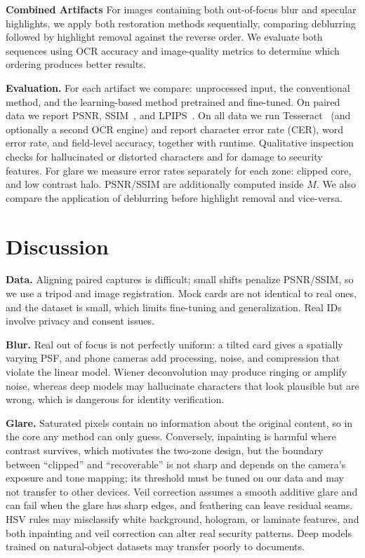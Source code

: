 \documentclass{article}
\begin{document}
\textbf{Combined Artifacts}
For images containing both out-of-focus blur and specular highlights, we apply both restoration methods sequentially, comparing deblurring followed by highlight removal against the reverse order. We evaluate both sequences using OCR accuracy and image-quality metrics to determine which ordering produces better results.

\textbf{Evaluation.} For each artifact we compare: unprocessed input, the conventional method, and the learning-based method pretrained and fine-tuned. On paired data we report PSNR, SSIM~\cite{wang2004}, and LPIPS~\cite{zhang2018}. On all data we run Tesseract~\cite{smith2007} (and optionally a second OCR engine) and report character error rate (CER), word error rate, and field-level accuracy, together with runtime. Qualitative inspection checks for hallucinated or distorted characters and for damage to security features. For glare we measure error rates separately for each zone: clipped core, and low contrast halo. PSNR/SSIM are additionally computed inside $M$. We also compare the application of deblurring before highlight removal and vice-versa.

\section{Discussion}
\label{sec:majhead}
\textbf{Data.} Aligning paired captures is difficult; small shifts penalize PSNR/SSIM, so we use a tripod and image registration. Mock cards are not identical to real ones, and the dataset is small, which limits fine-tuning and generalization. Real IDs involve privacy and consent issues.

\textbf{Blur.} Real out of focus is not perfectly uniform: a tilted card gives a spatially varying PSF, and phone cameras add processing, noise, and compression that violate the linear model. Wiener deconvolution may produce ringing or amplify noise, whereas deep models may hallucinate characters that look plausible but are wrong, which is dangerous for identity verification.

\textbf{Glare.} Saturated pixels contain no information about the original content, so in the core any method can only guess. Conversely, inpainting is harmful where contrast survives, which motivates the two-zone design, but the boundary between ``clipped'' and ``recoverable'' is not sharp and depends on the camera's exposure and tone mapping; its threshold must be tuned on our data and may not transfer to other devices. Veil correction assumes a smooth additive glare and can fail when the glare has sharp edges, and feathering can leave residual seams. HSV rules may misclassify white background, hologram, or laminate features, and both inpainting and veil correction can alter real security patterns. Deep models trained on natural-object datasets may transfer poorly to documents.
\end{document}
